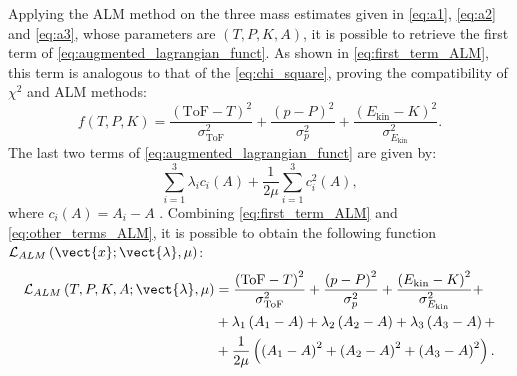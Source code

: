Applying the ALM method on the three mass estimates given in \autoref{eq:a1}, \autoref{eq:a2} and \autoref{eq:a3}, whose parameters are $\left(T,P,K,A\right)$, it is possible to retrieve the first term of \autoref{eq:augmented_lagrangian_funct}. As shown in \autoref{eq:first_term_ALM}, this term is analogous to that of the \autoref{eq:chi_square}, proving the compatibility of $\chi^2$ and ALM methods:
\begin{equation}
	f\left(T,P,K\right)=\frac{\left(\text{ToF}-T\right)^2}{\sigma^2_{\text{ToF}}}+\frac{\left(p-P\right)^2}{\sigma^2_{p}}+\frac{\left(E_\text{kin}-K\right)^2}{\sigma^2_{E_\text{kin}}}.
	\label{eq:first_term_ALM}
\end{equation}
The last two terms of \autoref{eq:augmented_lagrangian_funct} are given by:
\begin{equation}
	\sum_{i=1}^{3}\lambda_ic_i\left(A\right)+\frac{1}{2\mu}\sum_{i=1}^{3}c_i^2\left(A\right),
	\label{eq:other_terms_ALM}
\end{equation}
where $c_i\left(A\right)=A_i-A$ \cite{valle2019design}. Combining \autoref{eq:first_term_ALM} and \autoref{eq:other_terms_ALM}, it is possible to obtain the following function $\mathcal{L}_{ALM}\left(\vect{x};\vect{\lambda},\mu\right)$:
\begin{equation}
	\begin{aligned} 
		\mathcal{L}_{ALM}\left(T,P,K,A;\vect{\lambda},\mu\right)&=\frac{\left(\text{ToF}-T\right)^2}{\sigma^2_{\text{ToF}}}+\frac{\left(p-P\right)^2}{\sigma^2_{p}}+\frac{\left(E_\text{kin}-K\right)^2}{\sigma^2_{E_\text{kin}}}+\\ 
		&+\lambda_1\left(A_1-A\right)+\lambda_2\left(A_2-A\right)+\lambda_3\left(A_3-A\right)+\\ 
		&+\frac{1}{2\mu}\left(\left(A_1-A\right)^2+\left(A_2-A\right)^2+\left(A_3-A\right)^2\right).
	\end{aligned}
	\label{eq:alm_analysis}
\end{equation}